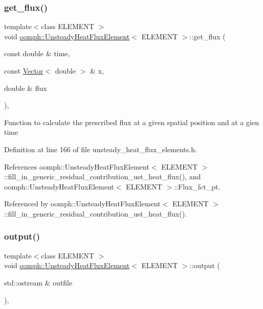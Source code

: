 \subsubsection{\texorpdfstring{get\+\_\+flux()}{get\_flux()}}
{\footnotesize\ttfamily template$<$class E\+L\+E\+M\+E\+NT $>$ \\
void \hyperlink{classoomph_1_1UnsteadyHeatFluxElement}{oomph\+::\+Unsteady\+Heat\+Flux\+Element}$<$ E\+L\+E\+M\+E\+NT $>$\+::get\+\_\+flux (\begin{DoxyParamCaption}\item[{const double \&}]{time,  }\item[{const \hyperlink{classoomph_1_1Vector}{Vector}$<$ double $>$ \&}]{x,  }\item[{double \&}]{flux }\end{DoxyParamCaption})\hspace{0.3cm}{\ttfamily [inline]}, {\ttfamily [protected]}}

Function to calculate the prescribed flux at a given spatial position and at a gien time 

Definition at line 166 of file unsteady\+\_\+heat\+\_\+flux\+\_\+elements.\+h.



References oomph\+::\+Unsteady\+Heat\+Flux\+Element$<$ E\+L\+E\+M\+E\+N\+T $>$\+::fill\+\_\+in\+\_\+generic\+\_\+residual\+\_\+contribution\+\_\+ust\+\_\+heat\+\_\+flux(), and oomph\+::\+Unsteady\+Heat\+Flux\+Element$<$ E\+L\+E\+M\+E\+N\+T $>$\+::\+Flux\+\_\+fct\+\_\+pt.



Referenced by oomph\+::\+Unsteady\+Heat\+Flux\+Element$<$ E\+L\+E\+M\+E\+N\+T $>$\+::fill\+\_\+in\+\_\+generic\+\_\+residual\+\_\+contribution\+\_\+ust\+\_\+heat\+\_\+flux().

\mbox{\label{classoomph_1_1UnsteadyHeatFluxElement_acd0d11f32966ffdb498ab7f64303bdc9}} 
\subsubsection{\texorpdfstring{output()}{output()}\hspace{0.1cm}{\footnotesize\ttfamily [1/4]}}
{\footnotesize\ttfamily template$<$class E\+L\+E\+M\+E\+NT $>$ \\
void \hyperlink{classoomph_1_1UnsteadyHeatFluxElement}{oomph\+::\+Unsteady\+Heat\+Flux\+Element}$<$ E\+L\+E\+M\+E\+NT $>$\+::output (\begin{DoxyParamCaption}\item[{std\+::ostream \&}]{outfile }\end{DoxyParamCaption})\hspace{0.3cm}{\ttfamily [inline]}, {\ttfamily [virtual]}}

